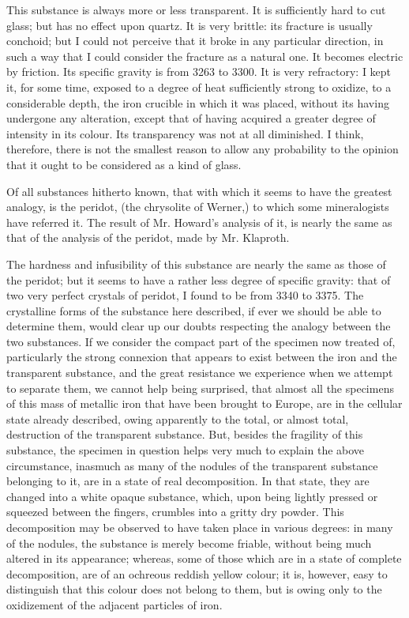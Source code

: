 \documentclass[a4paper, 12pt, oneside]{article}
\begin{document}
This substance is always more or less transparent. It is sufficiently hard to cut glass; but has no effect upon quartz. It is very brittle: its fracture is usually conchoid; but I could not perceive that it broke in any particular direction, in such a way that I could consider the fracture as a natural one. It becomes electric by friction. Its specific gravity is from 3263 to 3300. It is very refractory: I kept it, for some time, exposed to a degree of heat sufficiently strong to oxidize, to a considerable depth, the iron crucible in which it was placed, without its having undergone any alteration, except that of having acquired a greater degree of intensity in its colour. Its transparency was not at all diminished. I think, therefore, there is not the smallest reason to allow any probability to the opinion that it ought to be considered as a kind of glass.

Of all substances hitherto known, that with which it seems to have the greatest analogy, is the peridot, (the chrysolite of Werner,) to which some mineralogists have referred it. The result of Mr. Howard's analysis of it, is nearly the same as that of the analysis of the peridot, made by Mr. Klaproth.

The hardness and infusibility of this substance are nearly the same as those of the peridot; but it seems to have a rather less degree of specific gravity: that of two very perfect crystals of peridot, I found to be from 3340 to 3375. The crystalline forms of the substance here described, if ever we should be able to determine them, would clear up our doubts respecting the analogy between the two substances. If we consider the compact part of the specimen now treated of, particularly the strong connexion that appears to exist between the iron and the transparent substance, and the great resistance we experience when we attempt to separate them, we cannot help being surprised, that almost all the specimens of this mass of metallic iron that have been brought to Europe, are in the cellular state already described, owing apparently to the total, or almost total, destruction of the transparent substance. But, besides the fragility of this substance, the specimen in question helps very much to explain the above circumstance, inasmuch as many of the nodules of the transparent substance belonging to it, are in a state of real decomposition. In that state, they are changed into a white opaque substance, which, upon being lightly pressed or squeezed between the fingers, crumbles into a gritty dry powder. This decomposition may be observed to have taken place in various degrees: in many of the nodules, the substance is merely become friable, without being much altered in its appearance; whereas, some of those which are in a state of complete decomposition, are of an ochreous reddish yellow colour; it is, however, easy to distinguish that this colour does not belong to them, but is owing only to the oxidizement of the adjacent particles of iron.
\end{document}
